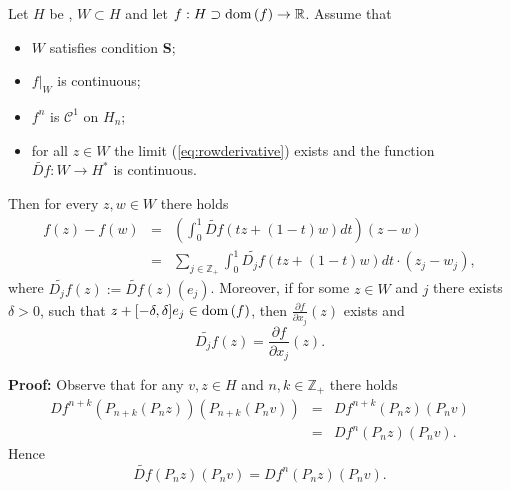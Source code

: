 \begin{lemma}
	\label{lem:df-form}
	Let $H$ be \gss, $W\subset H$ and let $f:H \supset {\rm dom}\, (f) \to \mathbb{R}$.
	Assume that
	\begin{itemize}
		\item $W$ satisfies condition \textbf{S};
		\item $f|_W$ is continuous;
		\item $f^n$ is $\mathcal C^1$ on $H_n$;
		\item for all $z \in W$ the limit (\ref{eq:rowderivative}) exists and the function $ \widetilde{D f}: W \to H^*$ is continuous.
	\end{itemize}
	Then for every  $z,w \in W$ there holds
	\begin{eqnarray}
		f(z) - f(w) &=& \left(\int_{0}^1 \widetilde{Df}(t z + (1-t)w)dt\right) (z-w) \nonumber \\
		&=&\sum_{j\in\mathbb Z_+}  \int_0^1 \widetilde{D_j f}(t z + (1-t)w)dt \cdot (z_j - w_j),    \label{eq:diff-f-onW}
	\end{eqnarray}
	where $\widetilde{D_j f}(z) := \widetilde{D f}(z)(e_j)$. Moreover, if for some $z \in W$ and $j$ there exists $\delta>0$, such that $ z+[-\delta,\delta]e_j \in {\rm dom}\, (f)$, then   $\frac{\partial f}{\partial x_j}(z)$  exists and
	\begin{equation}
		\widetilde{D_j f}(z)= \frac{\partial f}{\partial x_j}(z).  \label{eq:partderF}
	\end{equation}
\end{lemma}
\textbf{Proof:}
Observe that for any $v,z \in H$ and $n,k \in \mathbb{Z}_+$ there holds
\begin{eqnarray*}
	Df^{n+k}(P_{n+k}(P_nz)) (P_{n+k}(P_nv))&=&Df^{n+k}(P_nz) (P_nv)\\
	&=& Df^{n}(P_nz) (P_nv).
\end{eqnarray*}
Hence
\begin{equation}
	\widetilde{D f}(P_nz)(P_n v)= Df^n(P_nz) (P_nv).  \label{eq:wtDf=Df-onP}
\end{equation}


